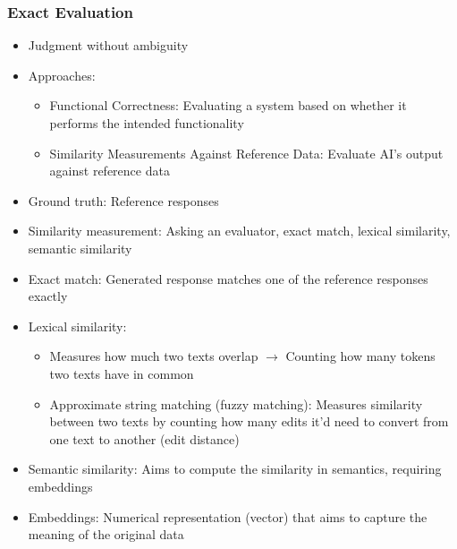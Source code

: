 \documentclass[11pt]{scrartcl}
\begin{document}
\subsubsection*{Exact Evaluation}
\begin{itemize}
	\item Judgment without ambiguity
	\item Approaches:
	\begin{itemize}
		\item Functional Correctness: Evaluating a system based on whether it performs the intended functionality
		\item Similarity Measurements Against Reference Data: Evaluate AI's output against reference data
	\end{itemize}
	\item Ground truth: Reference responses
	\item Similarity measurement: Asking an evaluator, exact match, lexical similarity, semantic similarity
	\item Exact match: Generated response matches one of the reference responses exactly
	\item Lexical similarity: 
	\begin{itemize}
		\item Measures how much two texts overlap $\to$ Counting how many tokens two texts have in common
		\item Approximate string matching (fuzzy matching): Measures similarity between two texts by counting how many edits it'd need to convert from one text to another (edit distance)
	\end{itemize}
	\item Semantic similarity: Aims to compute the similarity in semantics, requiring embeddings
	\item Embeddings: Numerical representation (vector) that aims to capture the meaning of the original data
\end{itemize}
\end{document}
